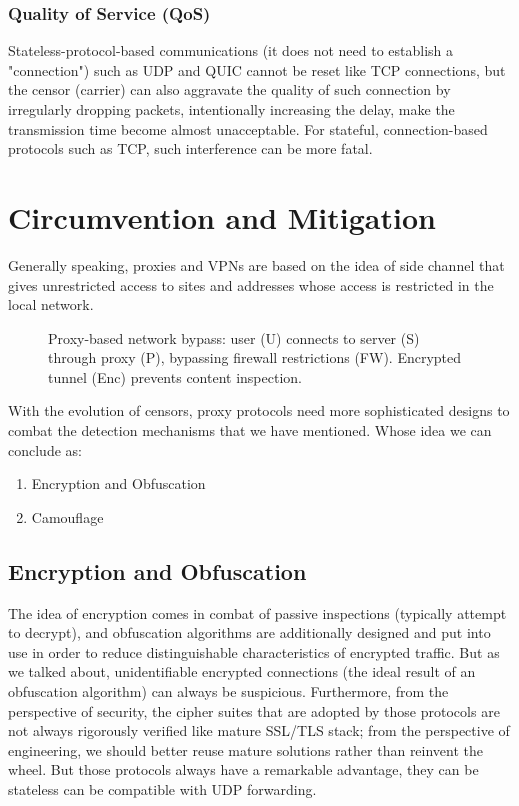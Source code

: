 \documentclass[conference]{IEEEtran}
\begin{document}
\subsubsection{Quality of Service (QoS)}\label{sec:qos}
Stateless-protocol-based communications (it does not need to establish a "connection") such as UDP and QUIC cannot be reset like TCP connections, but the censor (carrier) can also aggravate the quality of such connection by irregularly dropping packets, intentionally increasing the delay, make the transmission time become almost unacceptable.
For stateful, connection-based protocols such as TCP, such interference can be more fatal.

\section{Circumvention and Mitigation}\label{section:cam}
Generally speaking, proxies and VPNs are based on the idea of side channel that gives unrestricted access to sites and addresses whose access is restricted in the local network.

\begin{figure}[!h]
\centering

\caption{Proxy-based network bypass: user (U) connects to server (S) through proxy (P), bypassing firewall restrictions (FW). Encrypted tunnel (Enc) prevents content inspection.}
\label{fig:proxy}
\end{figure}

With the evolution of censors, proxy protocols need more sophisticated designs to combat the detection mechanisms that we have mentioned. Whose idea we can conclude as:
\begin{enumerate}
    \item Encryption and Obfuscation
    \item Camouflage
\end{enumerate}

\subsection{Encryption and Obfuscation}
The idea of encryption comes in combat of passive inspections (typically attempt to decrypt), and obfuscation algorithms are additionally designed and put into use in order to reduce distinguishable characteristics of encrypted traffic.
But as we talked about, unidentifiable encrypted connections (the ideal result of an obfuscation algorithm) can always be suspicious. Furthermore, from the perspective of security, the cipher suites that are adopted by those protocols are not always rigorously verified like mature SSL/TLS stack; from the perspective of engineering, we should better reuse mature solutions rather than reinvent the wheel.
But those protocols always have a remarkable advantage, they can be stateless can be compatible with UDP forwarding.
\end{document}
